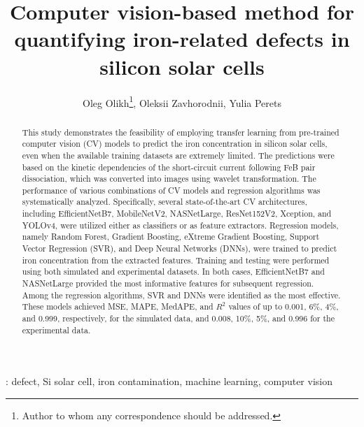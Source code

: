 \documentclass[10pt]{iopart}
\begin{document}
\title[Computer vision for quantifying Fe-related defects in Si solar cells]{Computer vision-based method for quantifying iron-related defects in silicon solar cells}

\author{Oleg Olikh\footnote{Author to whom any correspondence should be addressed.}, Oleksii Zavhorodnii, Yulia Perets}

\address{Taras Shevchenko National University of Kyiv, Kyiv 01601, Ukraine}


\begin{abstract}
This study demonstrates the feasibility of employing transfer learning from pre-trained computer vision (CV) models
to predict the iron concentration in silicon solar cells, even when the available training datasets are extremely limited.
The predictions were based on the kinetic dependencies of the short-circuit current following FeB pair dissociation,
which was converted into images using wavelet transformation.
The performance of various combinations of CV models and regression algorithms was systematically analyzed.
Specifically, several state-of-the-art CV architectures,
including EfficientNetB7, MobileNetV2, NASNetLarge, ResNet152V2, Xception, and YOLOv4,
were utilized either as classifiers or as feature extractors.
Regression models, namely Random Forest, Gradient Boosting, eXtreme Gradient Boosting, Support Vector Regression (SVR),
and Deep Neural Networks (DNNs), were trained to predict iron concentration from the extracted features.
Training and testing were performed using both simulated and experimental datasets.
In both cases, EfficientNetB7 and NASNetLarge provided the most informative features for subsequent regression.
Among the regression algorithms, SVR and DNNs were identified as the most effective.
These models achieved MSE, MAPE, MedAPE, and $R^2$ values of up
to 0.001, 6\%, 4\%, and 0.999, respectively, for the simulated data,
and 0.008, 10\%, 5\%, and 0.996 for the experimental data.
\end{abstract}

%
\vspace{2pc}
: defect, Si solar cell, iron contamination, machine learning, computer vision

\submitto{\SST}
%
\end{document}
